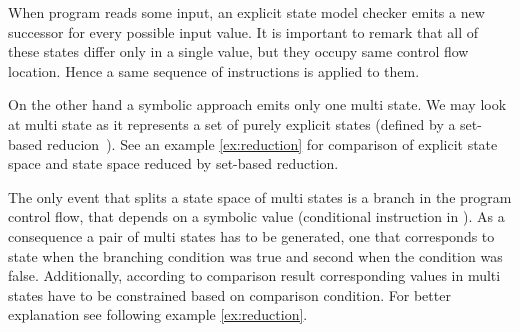 When program reads some input, an explicit state model checker emits a
new successor for every possible input value. It is important to remark that all of
these states differ only in a single value, but they occupy same control flow
location. Hence a same sequence of instructions is applied to them.


On the other hand a symbolic approach emits only one multi state. We may look at
multi state as it represents a set of purely explicit states (defined by
a set-based reducion~\cite{Havel14}). See an example \ref{ex:reduction} for comparison of
explicit state space and state space reduced by set-based reduction.

The only event that splits a state space of multi states is a branch in the
program control flow, that depends on a symbolic value (conditional 
instruction in \LLVM). As a consequence a pair of multi states has to be
generated, one that corresponds to state when the branching condition was true and
second when the condition was false. Additionally, according to comparison result
corresponding values in multi states have to be constrained based on comparison
condition. For better explanation see following example \ref{ex:reduction}.

